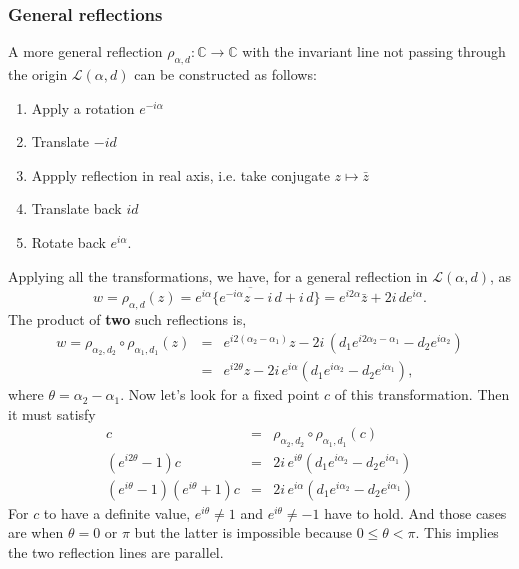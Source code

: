 \documentclass{article}
\begin{document}
\subsubsection{General reflections}
\label{sec-3-1-2}
A more general reflection $\rho_{\alpha,d}:\mathbb{C} \rightarrow \mathbb{C}$ with the invariant line not passing through the origin $\mathcal{L}(\alpha, d)$ can be constructed as follows:
\begin{enumerate}
\item Apply a rotation $e^{-i\alpha}$
\item Translate $-id$
\item Appply reflection in real axis, i.e. take conjugate $z \mapsto \bar{z}$
\item Translate back $id$
\item Rotate back $e^{i\alpha}$.
\end{enumerate}
Applying all the transformations, we have, for a general reflection in $\mathcal{L}(\alpha, d)$, as
\begin{equation}
w = \rho_{\alpha,d} (z) = e^{i\alpha}\{ \overline{e^{-i\alpha} z - i\,d} + i\,d \} = e^{i2\alpha} \bar{z} + 2i \, de^{i\alpha}.
\end{equation}
The product of \textbf{two} such reflections is,
\begin{eqnarray}
w = \rho_{\alpha_{2}, d_{2}} \circ \rho_{\alpha_{1},d_{1}} (z) &=& e^{i2(\alpha_{2} - \alpha_{1})} z - 2i \, ( d_{1} e^{i2\alpha_{2} - \alpha_{1}} - d_{2} e^{i\alpha_{2}})  \nonumber \\
&=& e^{i2\theta} z - 2i \, e^{i\alpha}( d_{1} e^{i\alpha_{2}} - d_{2} e^{i\alpha_{1}}),
\end{eqnarray}
where $\theta = \alpha_{2} - \alpha_{1}$. Now let's look for a fixed point $c$ of this transformation. Then it must satisfy
\begin{eqnarray}
c &=&  \rho_{\alpha_{2}, d_{2}} \circ \rho_{\alpha_{1},d_{1}} (c) \nonumber \\
(e^{i2\theta} - 1)c &=&  2i \, e^{i\theta}( d_{1} e^{i\alpha_{2}} - d_{2} e^{i\alpha_{1}}) \nonumber  \\
(e^{i\theta} - 1)(e^{i\theta} + 1)c &=&  2i \, e^{i\alpha}( d_{1} e^{i\alpha_{2}} - d_{2} e^{i\alpha_{1}}) \nonumber 
\end{eqnarray}
For $c$ to have a definite value, $e^{i\theta} \ne 1$ and $e^{i\theta} \ne -1$ have to hold. And those cases are when $\theta = 0$ or $\pi$ but the latter is impossible because $0 \le \theta < \pi$. 
This implies the two reflection lines are parallel.\\
\end{document}
